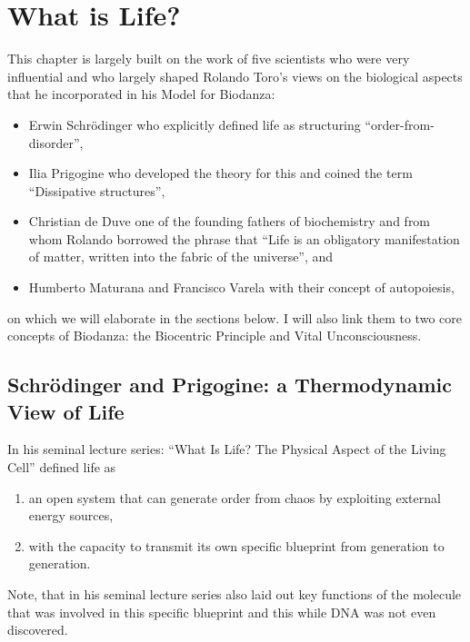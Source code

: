 \documentclass[
  11pt,
]{book}
\providecommand{\tightlist}{%
  \setlength{\itemsep}{0pt}\setlength{\parskip}{0pt}}
\begin{document}
\hypertarget{what-is-life}{%
\chapter{What is Life?}\label{what-is-life}}

This chapter is largely built on the work of five scientists who were very influential and who largely shaped Rolando Toro's views on the biological aspects that he incorporated in his Model for Biodanza:

\begin{itemize}
\tightlist
\item
  Erwin Schrödinger who explicitly defined life as structuring ``order-from-disorder'',
\item
  Ilia Prigogine who developed the theory for this and coined the term ``Dissipative structures'',
\item
  Christian de Duve one of the founding fathers of biochemistry and from whom Rolando borrowed the phrase that ``Life is an obligatory manifestation of matter, written into the fabric of the universe'', and
\item
  Humberto Maturana and Francisco Varela with their concept of autopoiesis,
\end{itemize}

on which we will elaborate in the sections below. I will also link them to two core concepts of Biodanza: the Biocentric Principle and Vital Unconsciousness.

\hypertarget{schruxf6dinger-and-prigogine-a-thermodynamic-view-of-life}{%
\section{Schrödinger and Prigogine: a Thermodynamic View of Life}\label{schruxf6dinger-and-prigogine-a-thermodynamic-view-of-life}}

In his seminal lecture series: ``What Is Life? The Physical Aspect of the Living Cell'' \citet{schrodinger1944} defined life as

\begin{enumerate}
\def\labelenumi{\arabic{enumi}.}
\item
  an open system that can generate order from chaos by exploiting external energy sources,
\item
  with the capacity to transmit its own specific blueprint from generation to generation.
\end{enumerate}

Note, that in his seminal lecture series \citet{schrodinger1944} also laid out key functions of the molecule that was involved in this specific blueprint and this while DNA was not even discovered.
\end{document}
